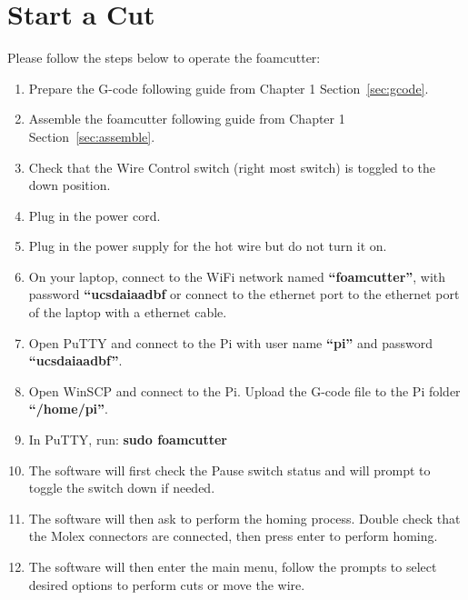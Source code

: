 \documentclass[titlepage,12pt,letter]{report}
\numberwithin{equation}{chapter}
\begin{document}
\section{Start a Cut}
Please follow the steps below to operate the foamcutter:
\begin{enumerate}[noitemsep,topsep=0pt]
	\item Prepare the G-code following guide from Chapter 1 Section~\ref{sec:gcode}.
	\item Assemble the foamcutter following guide from Chapter 1 Section~\ref{sec:assemble}.
	\item Check that the Wire Control switch (right most switch) is toggled to the down position.
	\item Plug in the power cord.
	\item Plug in the power supply for the hot wire but do not turn it on.
	\item On your laptop, connect to the WiFi network named \textbf{``foamcutter''}, with password \textbf{``ucsdaiaadbf} or connect to the ethernet port to the ethernet port of the laptop with a ethernet cable.
	\item Open PuTTY and connect to the Pi with user name \textbf{``pi''} and password \\ \textbf{``ucsdaiaadbf''}.
	\item Open WinSCP and connect to the Pi. Upload the G-code file to the Pi folder \\ \textbf{``/home/pi''}.
	\item In PuTTY, run: \textbf{sudo foamcutter}
	\item The software will first check the Pause switch status and will prompt to toggle the switch down if needed.
	\item The software will then ask to perform the homing process. Double check that the Molex connectors are connected, then press enter to perform homing. 
	\item The software will then enter the main menu, follow the prompts to select desired options to perform cuts or move the wire.
\end{enumerate}
\end{document}
